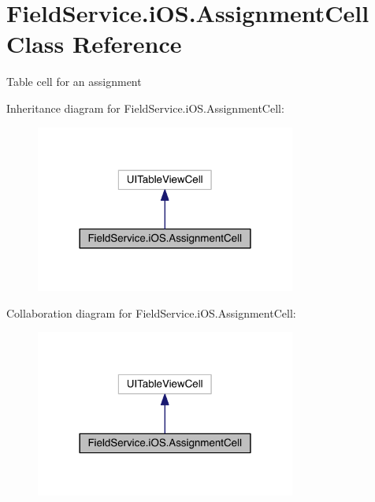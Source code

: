 \hypertarget{class_field_service_1_1i_o_s_1_1_assignment_cell}{\section{Field\+Service.\+i\+O\+S.\+Assignment\+Cell Class Reference}
\label{class_field_service_1_1i_o_s_1_1_assignment_cell}
}


Table cell for an assignment  




Inheritance diagram for Field\+Service.\+i\+O\+S.\+Assignment\+Cell\+:
\nopagebreak
\begin{figure}[H]
\begin{center}
\leavevmode
\includegraphics[width=242pt]{class_field_service_1_1i_o_s_1_1_assignment_cell__inherit__graph}
\end{center}
\end{figure}


Collaboration diagram for Field\+Service.\+i\+O\+S.\+Assignment\+Cell\+:
\nopagebreak
\begin{figure}[H]
\begin{center}
\leavevmode
\includegraphics[width=242pt]{class_field_service_1_1i_o_s_1_1_assignment_cell__coll__graph}
\end{center}
\end{figure}
